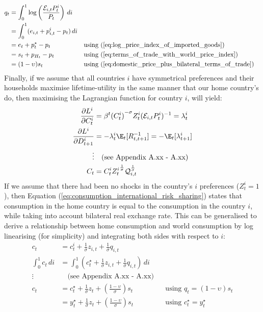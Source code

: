 \begin{align}
    q_t               & = \int_{0}^{1} \log \left( \frac{\mathcal{E}_{i,t}P_{t}^i}{P_t} \right) \, di                                                                           \\
    & = \int_{0}^{1} (e_{i,t} + p_{i,t}^i - p_t) \, di                              &  &                                                                      \\
    & = e_t + p_t^{\star} - p_t                                                     &  & \text{using (\ref{eq:log_price_index_of_imported_goods})}            \\
    & = s_t + p_{H_t} - p_t                                                         &  & \text{using (\ref{eq:terms_of_trade_with_world_price_index})}        \\
    & = (1-\upsilon)s_t                                                               &  & \text{using (\ref{eq:domestic_price_plus_bilateral_terms_of_trade})}
\end{align}
Finally, if we assume that all countries $i$ have symmetrical preferences and their households maximise lifetime-utility in the same manner that our home country's do, then maximising the Lagrangian function for country $i$, will yield:
\begin{align}
    \frac{\partial L^i}{\partial C_t^i} &= \beta^t {(C^i_t)}^{-\sigma} Z^i_t(\mathcal{E}_{i,t}P^i_{t})^{-1} = \lambda^i_t \nonumber\\
    \frac{\partial L^i}{\partial D_{t+1}^i} & = -\lambda^i_t \E_t[R^{-1}_{t,t+1}] = -\E_t[\lambda^i_{t+1}] \nonumber\\
    \vdots & \quad \text{(see Appendix A.xx - A.xx)} \\
    C_t  &= {C^i_t} {Z^i_t}^{\frac{1}{\sigma}} \mathcal{Q}_{i,t}^{\frac{1}{\sigma}} \label{eq:consumption_international_risk_sharing}
\end{align}
If we assume that there had been no shocks in the country's $i$ preferences ($Z^i_t = 1$), then Equation (\ref{eq:consumption_international_risk_sharing}) states that consumption in the home country is equal to the consumption in the country $i$, while taking into account bilateral real exchange rate. This can be generalised to derive a relationship between home consumption and world consumption by log linearising (for simplicity) and integrating both sides with respect to $i$:
\begin{align}
    c_t &= c_{t}^i + \frac{1}{\sigma}z_{i,t} + \frac{1}{\sigma}q_{i,t} \\
    \int_{0}^{1} c_t \, di & = \int_{0}^{1} \left( c_t^{\star} + \frac{1}{\sigma}z_{i,t} + \frac{1}{\sigma} q_{i,t}\right) \, di \\
    \vdots & \quad \text{(see Appendix A.xx - A.xx)} \\
    c_t & = c_t^{\star} + \frac{1}{\sigma}z_t + \left(\frac{1-\upsilon}{\sigma}\right)s_t \label{eq:link_between_consumption_and_world_consumption} &  & \text{using $q_t=(1-\upsilon)s_t$} \\
    & = y_t^{\star} + \frac{1}{\sigma}z_t + \left(\frac{1-\upsilon}{\sigma}\right)s_t \label{eq:link_between_consumption_and_world_output} &  & \text{using $c^{\star}_t=y^{\star}_t$} 
\end{align}
